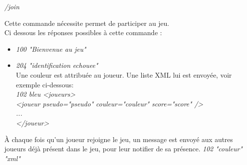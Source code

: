 \par
\textit{/join}

\par
Cette commande nécessite permet de participer au jeu.\\

Ci dessous les réponses possibles à cette commande :

\begin{itemize}

	\item \textit{100 "Bienvenue au jeu"} 

	\item \textit{204 "identification echouee"} \\
	Une couleur est attribuée au joueur. Une liste XML\label{xml} lui est envoyée, voir exemple ci-dessous:\\
	
		\textit{102 bleu <joueurs>} \\
			\tabto{1cm} \textit{<joueur pseudo="pseudo" couleur="couleur" score="score" />} \\
			\tabto{1cm}	\textit{...} \\
		\textit{</joueur>}

\end{itemize}

À chaque fois qu'un joueur rejoigne le jeu, un message est envoyé aux autres joueurs déjà présent dans le jeu, pour leur notifier de sa présence.
\textit{102 "couleur" "xml"} \\
